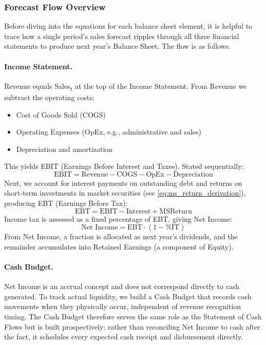 \documentclass[12pt,a4paper]{article}
\begin{document}
\subsubsection{Forecast Flow Overview}

Before diving into the equations for each balance sheet element, it is
helpful to trace how a single period's sales forecast ripples through
all three financial statements to produce next year's Balance Sheet. The
flow is as follows.

\paragraph{Income Statement.}
Revenue equals Sales\textsubscript{t} at the top of the Income
Statement. From Revenue we subtract the operating costs:

\begin{itemize}
\item Cost of Goods Sold (COGS)
\item Operating Expenses (OpEx, e.g., administrative and sales)
\item Depreciation and amortization
\end{itemize}

This yields EBIT (Earnings Before Interest and Taxes). Stated
sequentially:
\[
\text{EBIT} = \text{Revenue} - \text{COGS} - \text{OpEx} - \text{Depreciation}
\]
Next, we account for interest payments on outstanding debt and returns
on short-term investments in market securities (see
\eqref{eq:ms_return_derivation}), producing EBT (Earnings Before Tax):
\[
\text{EBT} = \text{EBIT} - \text{Interest} + \text{MSReturn}
\]
Income tax is assessed as a fixed percentage of EBT, giving Net Income:
\[
\text{Net Income} = \text{EBT} \cdot (1 - \text{\%IT})
\]
From Net Income, a fraction is allocated as next year's dividends, and
the remainder accumulates into Retained Earnings (a component of
Equity).

\paragraph{Cash Budget.}
Net Income is an accrual concept and does not correspond directly to
cash generated. To track actual liquidity, we build a Cash Budget that
records cash movements when they physically occur, independent of
revenue recognition timing. The Cash Budget therefore serves the same
role as the Statement of Cash Flows but is built prospectively: rather
than reconciling Net Income to cash after the fact, it schedules every
expected cash receipt and disbursement directly.
\end{document}
